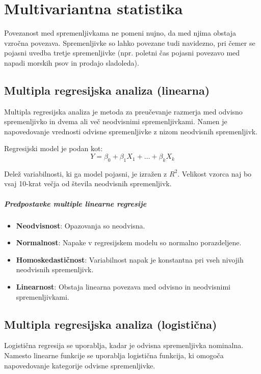 \chapter{Multivariantna statistika}

Povezanost med spremenljivkama ne pomeni nujno, da med njima obstaja vzročna povezava. Spremenljivke so lahko povezane tudi navidezno, pri čemer se pojasni uvedba tretje spremenljivke (npr. poletni čas pojasni povezavo med napadi morskih psov in prodajo sladoleda).

\section{Multipla regresijska analiza (linearna)}

Multipla regresijska analiza je metoda za preučevanje razmerja med odvisno spremenljivko in dvema ali več neodvisnimi spremenljivkami. Namen je napovedovanje vrednosti odvisne spremenljivke z nizom neodvisnih spremenljivk.

Regresijski model je podan kot:
\[Y = \beta_0 + \beta_1 X_1 + \ldots + \beta_k X_k\]

Delež variabilnosti, ki ga model pojasni, je izražen z $R^2$. Velikost vzorca naj bo vsaj 10-krat večja od števila neodvisnih spremenljivk.

\paragraph{Predpostavke multiple linearne regresije}
\begin{itemize}
    \item \textbf{Neodvisnost}: Opazovanja so neodvisna.
    \item \textbf{Normalnost}: Napake v regresijskem modelu so normalno porazdeljene.
    \item \textbf{Homoskedastičnost}: Variabilnost napak je konstantna pri vseh nivojih neodvisnih spremenljivk.
    \item \textbf{Linearnost}: Obstaja linearna povezava med odvisno in neodvisnimi spremenljivkami.
\end{itemize}

\section{Multipla regresijska analiza (logistična)}

Logistična regresija se uporablja, kadar je odvisna spremenljivka nominalna. Namesto linearne funkcije se uporablja logistična funkcija, ki omogoča napovedovanje kategorije odvisne spremenljivke.


